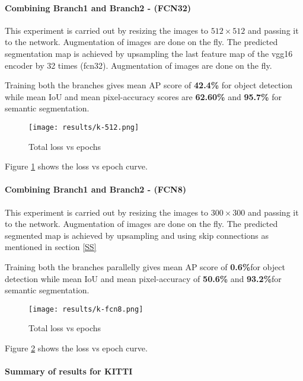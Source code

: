 \paragraph{Combining Branch1 and Branch2 - (FCN32)}

This experiment is carried out by resizing the images to $512\times512$ and passing it to the network. Augmentation of images are done on the fly. The predicted segmentation map is achieved by upsampling the last feature map of the \ac{vgg}16 encoder by 32 times (\ac{fcn}32). Augmentation of images are done on the fly.

Training both the branches gives mean AP score of \textbf{42.4\%} for object detection while mean IoU and mean pixel-accuracy scores are \textbf{62.60\%} and \textbf{95.7\%} for semantic segmentation. 

\begin{figure}[h!]
\centering
    \texttt{[image: results/k-512.png]}
    \caption{Total loss vs epochs}
    \label{k_fcn512}
\end{figure}

Figure \ref{k_fcn512} shows the loss vs epoch curve. 


\paragraph{Combining Branch1 and Branch2 - (FCN8)}

This experiment is carried out by resizing the images to $300\times300$ and passing it to the network. Augmentation of images are done on the fly. The predicted segmented map is achieved by upsampling and using skip connections as mentioned in section \ref{SS}

Training both the branches parallelly gives mean AP score of \textbf{0.6\%}for object detection while mean IoU and mean pixel-accuracy of \textbf{50.6\%} and  \textbf{93.2\%}for semantic segmentation.

\begin{figure}[h!]
\centering
    \texttt{[image: results/k-fcn8.png]}
    \caption{Total loss vs epochs}
    \label{k_fcn8}
\end{figure}

Figure \ref{k_fcn8} shows the loss vs epoch curve. 

\clearpage

\paragraph{Summary of results for KITTI}

